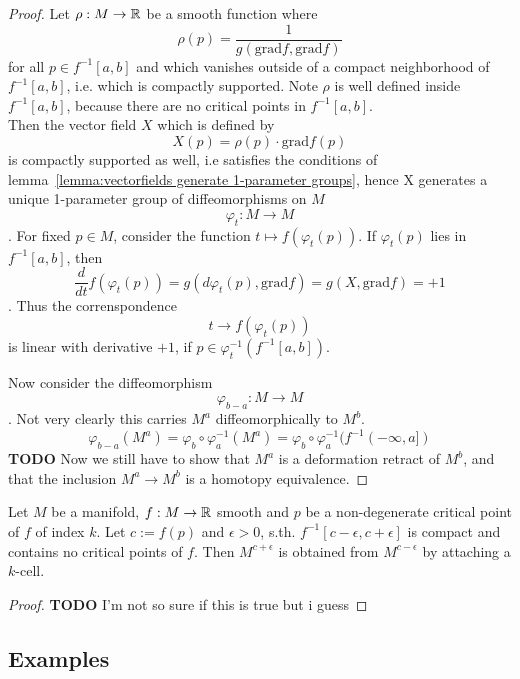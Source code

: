 \documentclass[a4paper,11pt]{article}
\begin{document}
\begin{proof}
   Let $\rho: M \rightarrow {\mathbb R}$ be a smooth function where 
   \[ \rho(p) = \frac{1}{g(\text{grad} f, \text{grad} f)} \]
   for all $p \in f^{-1}[a, b]$ and which vanishes outside of a compact neighborhood of $f^{-1}[a, b]$, i.e. which is 
   compactly supported.  
   Note $\rho$ is well defined inside $f^{-1}[a, b]$, because there are no critical points in $f^{-1}[a, b]$. \\ 
   Then the vector field $X$ which is defined by
   \[ X(p) = \rho(p) \cdot \text{grad} f (p) \]
   is compactly supported as well, i.e satisfies the conditions of lemma~\ref{lemma:vectorfields generate 1-parameter groups},
   hence X generates a unique 1-parameter group of diffeomorphisms on $M$
   \[ \varphi_t : M \rightarrow M \]. 
   For fixed $p \in M$, consider the function $ t \mapsto f(\varphi_t(p)) $. If $\varphi_t(p)$ lies in $f^{-1}[a, b]$, then
   \[ \frac{d}{dt}f (\varphi_t(p)) = g(d\varphi_t(p), \text{grad}f) = g(X, \text{grad}f) = + 1 \].
   Thus the correnspondence 
   \[ t \rightarrow f(\varphi_t(p)) \]
   is linear with derivative $+1$, if $p \in \varphi_t^{-1}(f^{-1}[a, b])$. 

   Now consider the diffeomorphism 
   \[ \varphi_{b-a}: M \rightarrow M \].
   Not very clearly this carries $M^a$ diffeomorphically to $M^b$. 
   \[ \varphi_{b-a}(M^a) = \varphi_b \circ \varphi_a^{-1}(M^a) = \varphi_b \circ \varphi_a^{-1}(f^{-1}(-\infty, a]) \]
   \textbf{TODO}
   Now we still have to show that $M^a$ is a deformation retract of $M^b$, and that the inclusion
   $M^a \rightarrow M^b$ is a homotopy equivalence. 
\end{proof}

\begin{theorem}
   \label{theorem:2nd deformation lemma}
   Let $M$ be a manifold, $f: M \rightarrow {\mathbb R}$ smooth and $p$ be a non-degenerate critical point
   of $f$ of index $k$. Let $c := f(p)$ and $\epsilon > 0$, s.th. $f^{-1}[c-\epsilon, c+\epsilon]$
   is compact and contains no critical points of $f$. Then $M^{c+\epsilon}$ is obtained from $M^{c-\epsilon}$
   by attaching a $k$-cell.
\end{theorem}

\begin{proof}
   \textbf{TODO}
   I'm not so sure if this is true but i guess
\end{proof}

\subsection{Examples}
\end{document}

